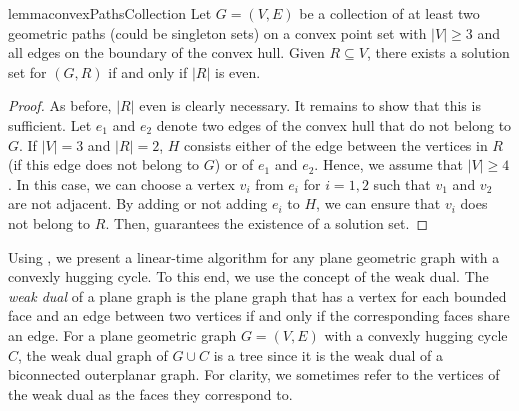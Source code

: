 \documentclass[a4paper,runningheads,cleveref,thm-restate]{lipics-v2021}
\newcommand{\hset}{solution set\xspace}
\newcommand{\hug}{hugging cycle\xspace}
\begin{document}
\begin{restatable}{lemma}{convexPathsCollection}
	\label{lemma:convexPathsCollection}
	Let $G=(V,E)$ be a collection of at least two geometric paths (could be singleton sets) on a convex point set with $|V|\geq 3$ and all edges on the boundary of the convex hull. 
	Given $R\subseteq V$, 
	there exists a \hset for $(G,R)$ if and only if $|R|$ is even.
\end{restatable}
\begin{proof}
	As before, $|R|$ even is clearly necessary. It remains to show that this is sufficient.
	Let $e_1$ and $e_2$ denote two edges of the convex hull that do not belong to $G$. If $|V|= 3$ and $|R|=2$, $H$ consists either of the edge between the vertices in $R$ (if this edge does not belong to $G$) or of $e_1$ and $e_2$. Hence, we assume that $|V|\geq 4$. In this case, we can choose a vertex $v_i$ from $e_i$ for $i=1,2$ such that $v_1$ and $v_2$ are not adjacent. 
	By adding or not adding $e_i$ to $H$, we can ensure that $v_i$ does not belong to $R$. 
	Then,  guarantees the existence of a \hset.
\end{proof}


Using , we present a linear-time algorithm for any plane geometric graph with a convexly \hug. To this end, we use the concept of the weak dual.
%
{The \emph{weak dual} of a plane graph is the plane graph that has a
	vertex for each bounded face and an edge between two vertices if and only if the corresponding faces share an edge. 
	For a plane geometric graph $G=(V,E)$ 
	with a convexly \hug $C$, 
	the weak dual graph of $G\cup C$
	is a tree since it is the weak dual of a biconnected outerplanar graph. 
} 
For clarity, we sometimes refer to the vertices of the weak dual as the faces they correspond to. 
\end{document}

